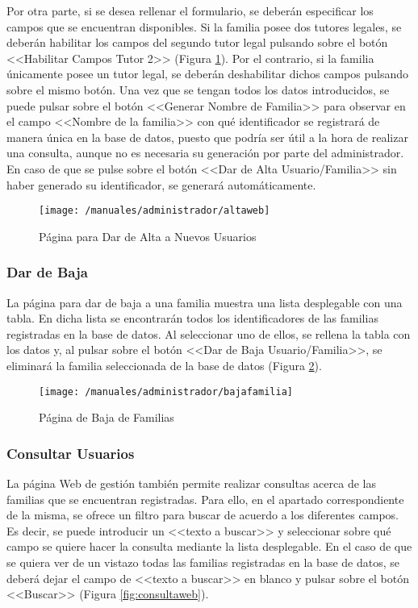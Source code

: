Por otra parte, si se desea rellenar el formulario, se deberán especificar los campos que se encuentran disponibles. Si la familia posee dos tutores legales, se deberán habilitar los campos del segundo tutor legal pulsando sobre el botón <<Habilitar Campos Tutor 2>> (Figura \ref{fig:altaweb}). Por el contrario, si la familia únicamente posee un tutor legal, se deberán deshabilitar dichos campos pulsando sobre el mismo botón. Una vez que se tengan todos los datos introducidos, se puede pulsar sobre el botón <<Generar Nombre de Familia>> para observar en el campo <<Nombre de la familia>> con qué identificador se registrará de manera única en la base de datos, puesto que podría ser útil a la hora de realizar una consulta, aunque no es necesaria su generación por parte del administrador. En caso de que se pulse sobre el botón <<Dar de Alta Usuario/Familia>> sin haber generado su identificador, se generará automáticamente.

\begin{figure}[!h]
	\begin{center}
		\texttt{[image: /manuales/administrador/altaweb]}
		\caption{Página para Dar de Alta a Nuevos Usuarios}
		\label{fig:altaweb}
	\end{center}
\end{figure}

\clearpage

\subsubsection*{Dar de Baja}
La página para dar de baja a una familia muestra una lista desplegable con una tabla. En dicha lista se encontrarán todos los identificadores de las familias registradas en la base de datos. Al seleccionar uno de ellos, se rellena la tabla con los datos y, al pulsar sobre el botón <<Dar de Baja Usuario/Familia>>, se eliminará la familia seleccionada de la base de datos (Figura \ref{fig:bajaweb}).

\begin{figure}[!h]
	\begin{center}
		\texttt{[image: /manuales/administrador/bajafamilia]}
		\caption{Página de Baja de Familias}
		\label{fig:bajaweb}
	\end{center}
\end{figure}

\subsubsection*{Consultar Usuarios}
La página Web de gestión también permite realizar consultas acerca de las familias que se encuentran registradas. Para ello, en el apartado correspondiente de la misma, se ofrece un filtro para buscar de acuerdo a los diferentes campos. Es decir, se puede introducir un <<texto a buscar>> y seleccionar sobre qué campo se quiere hacer la consulta mediante la lista desplegable. En el caso de que se quiera ver de un vistazo todas las familias registradas en la base de datos, se deberá dejar el campo de <<texto a buscar>> en blanco y pulsar sobre el botón <<Buscar>> (Figura \ref{fig:consultaweb}).

